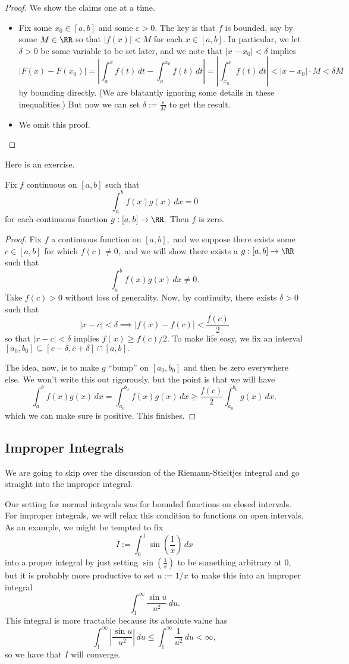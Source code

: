 \documentclass[../notes.tex]{subfiles}
\begin{document}
\begin{proof}
	We show the claims one at a time.
	\begin{itemize}
		\item Fix some $x_0\in[a,b]$ and some $\varepsilon>0.$ The key is that $f$ is bounded, say by some $M\in\RR$ so that $|f(x)|<M$ for each $x\in[a,b].$ In particular, we let $\delta>0$ be some variable to be set later, and we note that $|x-x_0|<\delta$ implies
		\[\left|F(x)-F(x_0)\right|=\left|\int_a^xf(t)\,dt-\int_a^{x_0}f(t)\,dt\right|=\left|\int_{x_0}^xf(t)\,dt\right|<|x-x_0|\cdot M<\delta M\]
		by bounding directly. (We are blatantly ignoring some details in these inequalities.) But now we can set $\delta:=\frac\varepsilon M$ to get the result.
		\item We omit this proof.
		\qedhere
	\end{itemize}
\end{proof}
Here is an exercise.
\begin{exe}[Ross 34.12]
	Fix $f$ continuous on $[a,b]$ such that
	\[\int_a^bf(x)g(x)\,dx=0\]
	for each continuous function $g:[a,b]\to\RR.$ Then $f$ is zero.
\end{exe}
\begin{proof}
	Fix $f$ a continuous function on $[a,b],$ and we suppose there exists some $c\in[a,b]$ for which $f(c)\ne0,$ and we will show there exists a $g:[a,b]\to\RR$ such that
	\[\int_a^bf(x)g(x)\,dx\ne0.\]
	Take $f(c)>0$ without loss of generality. Now, by continuity, there exists $\delta>0$ such that
	\[|x-c|<\delta\implies|f(x)-f(c)|<\frac{f(c)}2\]
	so that $|x-c|<\delta$ implies $f(x)\ge f(c)/2.$ To make life easy, we fix an interval $[a_0,b_0]\subseteq[c-\delta,c+\delta]\cap[a,b].$

	The idea, now, is to make $g$ ``bump'' on $[a_0,b_0]$ and then be zero everywhere else. We won't write this out rigorously, but the point is that we will have
	\[\int_a^bf(x)g(x)\,dx=\int_{a_0}^{b_0}f(x)g(x)\,dx\ge\frac{f(c)}2\int_{a_0}^{b_0}g(x)\,dx,\]
	which we can make sure is positive. This finishes.
\end{proof}

\subsection{Improper Integrals}
We are going to skip over the discussion of the Riemann-Stieltjes integral and go straight into the improper integral.

Our setting for normal integrals was for bounded functions on closed intervals. For improper integrals, we will relax this condition to functions on open intervals. As an example, we might be tempted to fix
\[I:=\int_0^1\sin\left(\frac1x\right)\,dx\]
into a proper integral by just setting $\sin\left(\frac1x\right)$ to be something arbitrary at $0,$ but it is probably more productive to set $u:=1/x$ to make this into an improper integral
\[\int_1^\infty\frac{\sin u}{u^2}\,du.\]
This integral is more tractable because its absolute value has
\[\int_1^\infty\left|\frac{\sin u}{u^2}\right|\,du\le\int_1^\infty\frac1{u^2}\,du<\infty,\]
so we have that $I$ will converge.
\end{document}
